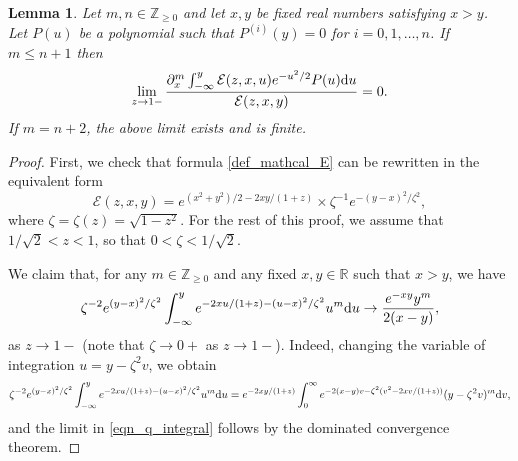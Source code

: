 \documentclass[12pt]{article}
\def\E{{\mathcal E}}
\def\r{{\mathbb R}}
\def\d{{\textnormal d}}
\newtheorem{lemma}{Lemma}
\begin{document}
\begin{lemma}\label{lemma6}
Let $m,n \in {\mathbb Z}_{\geqslant 0}$ and let $x, y$ be fixed real numbers satisfying $x>y$. Let $P(u)$ be a polynomial such that $P^{(i)}(y)=0$ for $i=0,1,\dots,n$. If $m\leqslant n+1$ then 
\begin{equation}\label{eqn_integral_limit}
\lim\limits_{z\to 1-} \frac{\partial_x^{m} \int_{-\infty}^y \E(z,x,u) e^{-u^2/2}  P(u) \d u}{\E(z,x,y)} 
=0. 
\end{equation}
If $m=n+2$, the above limit exists and is finite.  
\end{lemma}
\begin{proof}
First, we check that formula \eqref{def_mathcal_E} can be rewritten in the equivalent form  
\begin{equation}\label{E_factorization}
\E(z,x,y)  =e^{(x^2+y^2)/2  - 2xy/(1+z)} \times 
\zeta^{-1} 
e^{-(y-x)^2/\zeta^2 },
\end{equation}
where $\zeta=\zeta(z)=\sqrt{1-z^2}$. For the rest of this proof, we assume that $1/\sqrt{2}<z<1$, so that $0<\zeta<1/\sqrt{2}$.  


 
We claim that, for any $m\in {\mathbb Z}_{\geqslant 0}$ and any fixed $x,y \in \r$  such that $x>y$, we have
\begin{equation}\label{eqn_q_integral}
\zeta^{-2} e^{(y-x)^2/\zeta^2} \int_{-\infty}^y  
e^{-2xu/(1+z)-(u-x)^2/\zeta^2}   u^m \d u \to 
\frac{e^{-x y}y^m}{2(x-y)},  
\end{equation}
as $z\to 1-$ (note that $\zeta\to 0+$ as $z\to 1-$). 
Indeed, changing the variable of integration $u=y-\zeta^2 v$, we obtain
\[
\zeta^{-2}  e^{(y-x)^2/\zeta^2}  \int_{-\infty}^y  
e^{-2xu/(1+z)-(u-x)^2/\zeta^2}   u^m \d u
= e^{-2x y/(1+z)} \int_0^{\infty} e^{-2(x-y)v -\zeta^2 (v^2-2xv/(1+z))}  (y-\zeta^2 v)^m \d v,
\]
and the limit in \eqref{eqn_q_integral} follows by the dominated convergence theorem. 





\end{proof}
\end{document}
